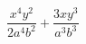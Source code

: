 \begin{ex}
	\begin{condition}
		\( \dfrac{x^4y^2}{2a^4b^2}+\dfrac{3xy^3}{a^3b^3} \)
	\end{condition}
\end{ex}